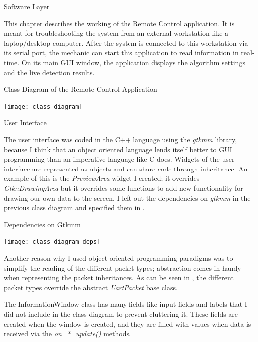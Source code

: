 \documentclass{matthijs}
\begin{document}
	\begin{hoofdstuk}{Software Layer}

		This chapter describes the working of the Remote Control application.
		It is meant for troubleshooting the system from an external workstation like a laptop/desktop computer.
		After the system is connected to this workstation via its serial port, the mechanic can start this application to read information in real-time.
		On its main GUI window, the application displays the algorithm settings and the live detection results.
		\begin{figuur}{Class Diagram of the Remote Control Application}
			\singlespacing
			\centerline{
				\texttt{[image: class-diagram]}
			}
			\onehalfspacing
		\end{figuur}

		\begin{paragraaf}{User Interface}

			The user interface was coded in the C++ language using the \textit{gtkmm} library, because I think that an object oriented language lends itself better to GUI programming than an imperative language like C does.
			Widgets of the user interface are represented as objects and can share code through inheritance.
			An example of this is the \textit{PreviewArea} widget I created; it overrides \textit{Gtk::DrawingArea} but it overrides some functions to add new functionality for drawing our own data to the screen.
			I left out the dependencies on \textit{gtkmm} in the previous class diagram and specified them in .
			
			\vspace{-1.5ex}
			\begin{figuur}{Dependencies on Gtkmm}
				\singlespacing
				\centerline{
					\texttt{[image: class-diagram-deps]}
				}
				\onehalfspacing
			\end{figuur}

			Another reason why I used object oriented programming paradigms was to simplify the reading of the different packet types; abstraction comes in handy when representing the packet inheritances.
			As can be seen in , the different packet types override the abstract \textit{UartPacket} base class.

			\bigskip

			The InformationWindow class has many fields like input fields and labels that I did not include in the class diagram to prevent cluttering it.
			These fields are created when the window is created, and they are filled with values when data is received via the \textit{on\_*\_update(\textellipsis)} methods.


\end{paragraaf}
\end{hoofdstuk}
\end{document}
